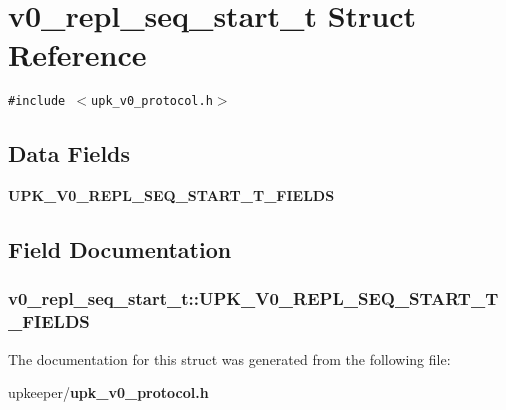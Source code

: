 \section{v0\_\-repl\_\-seq\_\-start\_\-t Struct Reference}
\label{structv0__repl__seq__start__t}
{\tt \#include $<$upk\_\-v0\_\-protocol.h$>$}

\subsection*{Data Fields}
\begin{CompactItemize}
\item 
\bf{UPK\_\-V0\_\-REPL\_\-SEQ\_\-START\_\-T\_\-FIELDS}
\end{CompactItemize}


\subsection{Field Documentation}
\subsubsection{\setlength{\rightskip}{0pt plus 5cm}\bf{v0\_\-repl\_\-seq\_\-start\_\-t::UPK\_\-V0\_\-REPL\_\-SEQ\_\-START\_\-T\_\-FIELDS}}\label{structv0__repl__seq__start__t_135070f37e86e50239ad9690d713cd4b}




The documentation for this struct was generated from the following file:\begin{CompactItemize}
\item 
upkeeper/\bf{upk\_\-v0\_\-protocol.h}\end{CompactItemize}
